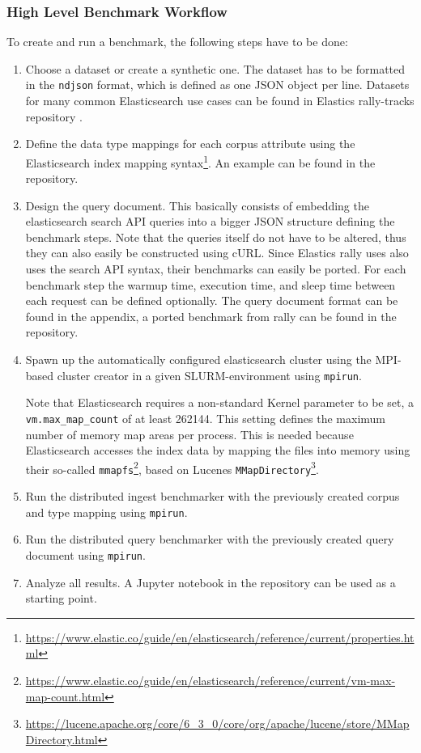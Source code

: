 \subsubsection{High Level Benchmark Workflow}
To create and run a benchmark, the following steps have to be done:
\begin{enumerate}
  \item Choose a dataset or create a synthetic one. The dataset has to be formatted in the \texttt{ndjson} format, which is defined as one JSON object per line. Datasets for many common Elasticsearch use cases can be found in Elastics rally-tracks repository \cite{rallytracks}.
  \item Define the data type mappings for each corpus attribute using the Elasticsearch index mapping syntax\footnote{\url{https://www.elastic.co/guide/en/elasticsearch/reference/current/properties.html}}. An example can be found in the repository.
  \item Design the query document. This basically consists of embedding the elasticsearch search API queries into a bigger JSON structure defining the benchmark steps.  Note that the queries itself do not have to be altered, thus they can also easily be constructed using cURL. Since Elastics rally uses also uses the search API syntax, their benchmarks can easily be ported. For each benchmark step the warmup time, execution time, and sleep time between each request can be defined optionally. The query document format can be found in the appendix, a ported benchmark from rally can be found in the repository.
  \item Spawn up the automatically configured elasticsearch cluster using the \ac{MPI}-based cluster creator in a given SLURM-environment using \texttt{mpirun}. 

    Note that Elasticsearch requires a non-standard Kernel parameter to be set, a \texttt{vm.max\_map\_count} of at least 262144. This setting defines the maximum number of memory map areas per process. This is needed because Elasticsearch accesses the index data by mapping the files into memory using their so-called \texttt{mmapfs}\footnote{\url{https://www.elastic.co/guide/en/elasticsearch/reference/current/vm-max-map-count.html}}, based on Lucenes \texttt{MMapDirectory}\footnote{\url{https://lucene.apache.org/core/6_3_0/core/org/apache/lucene/store/MMapDirectory.html}}.
  \item Run the distributed ingest benchmarker with the previously created corpus and type mapping using \texttt{mpirun}.
  \item Run the distributed query benchmarker with the previously created query document using \texttt{mpirun}.
  \item Analyze all results. A Jupyter notebook in the repository can be used as a starting point.
\end{enumerate}

